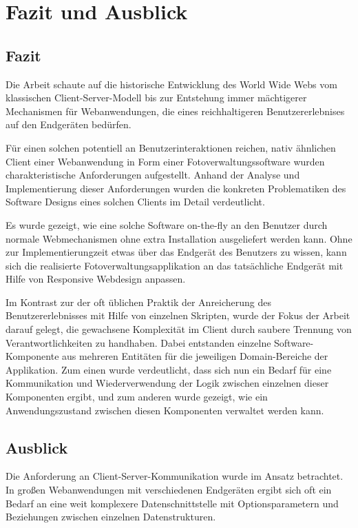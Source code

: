 \chapter{Fazit und Ausblick}

\section{Fazit}

Die Arbeit schaute auf die historische Entwicklung des World Wide Webs vom klassischen Client-Server-Modell bis zur Entstehung immer mächtigerer Mechanismen für Webanwendungen, die eines reichhaltigeren Benutzererlebnises auf den Endgeräten bedürfen.

Für einen solchen potentiell an Benutzerinteraktionen reichen, nativ ähnlichen Client einer Webanwendung in Form einer Fotoverwaltungssoftware wurden charakteristische Anforderungen aufgestellt. Anhand der Analyse und Implementierung dieser Anforderungen wurden die konkreten Pro­b­le­ma­tiken des Software Designs eines solchen Clients im Detail verdeutlicht.

Es wurde gezeigt, wie eine solche Software on-the-fly an den Benutzer durch normale Webmechanismen ohne extra Installation ausgeliefert werden kann.
Ohne zur Implementierungzeit etwas über das Endgerät des Benutzers zu wissen, kann sich die realisierte Fotoverwaltungsapplikation an das tatsächliche Endgerät mit Hilfe von Responsive Webdesign anpassen.

Im Kontrast zur der oft üblichen Praktik der Anreicherung des Benutzererlebnisses mit Hilfe von einzelnen Skripten, wurde der Fokus der Arbeit darauf gelegt, die gewachsene Komplexität im Client durch saubere Trennung von Verantwortlichkeiten zu handhaben. Dabei entstanden einzelne Software-Komponente aus mehreren Entitäten für die jeweiligen Domain-Bereiche der Applikation. Zum einen wurde verdeutlicht, dass sich nun ein Bedarf für eine Kommunikation und Wiederverwendung der Logik zwischen einzelnen dieser Komponenten ergibt, und zum anderen wurde gezeigt, wie ein Anwendungszustand zwischen diesen Komponenten verwaltet werden kann.

\section{Ausblick}

Die Anforderung an Client-Server-Kommunikation wurde im Ansatz betrachtet. In großen Webanwendungen mit verschiedenen Endgeräten ergibt sich oft ein Bedarf an eine weit komplexere Datenschnittstelle mit Optionsparametern und Beziehungen zwischen einzelnen Datenstrukturen.

